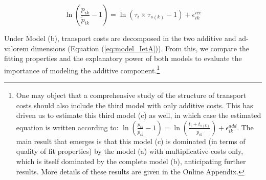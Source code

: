 \documentclass[a4paper,11pt]{article}
\begin{document}
\begin{equation}
\ln\left(\frac{p_{ik}}{\widetilde{p}_{ik}}-1 \right)= \ln \left(\tau_{i}\times\tau_{s(k)}-1 \right) + \epsilon^{ice}_{ik} \label{eq:model_nlI}
\end{equation}

Under Model (b), transport costs are decomposed in the two additive and ad-valorem dimensions (Equation (\ref{eq:model_IetA})).
From this, we compare the fitting properties and the explanatory power of both models to evaluate the importance of modeling the additive component.\footnote{One may object that a comprehensive study of the structure of transport costs should also include the third model with only additive costs. This has driven us to estimate this third model (c) as well, in which case the estimated equation is written according to: $\ln\left(\frac{p_{ik}}{\widetilde{p}_{ik}}-1 \right)= \ln \left(\frac{t_{i} + t_{s(k)}}{\widetilde{p}_{ik}}\right) + \epsilon^{add}_{ik}$.
The main result that emerges is that this model (c) is dominated (in terms of quality of fit properties) by the model (a) with multiplicative costs only, which is itself dominated by the complete model (b), anticipating further results. More details of these results are given in the Online Appendix.}



\end{document}
